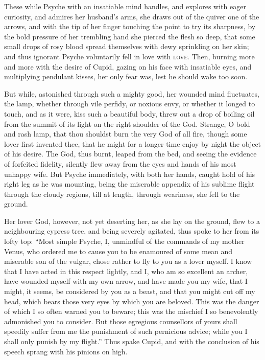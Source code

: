 \documentclass{article}
\begin{document}
These while Psyche with an insatiable mind handles, and explores with eager
curiosity, and admires her husband's arms, she draws out of the quiver one of
the arrows, and with the tip of her finger touching the point to try its
sharpness, by the bold pressure of her trembling hand she pierced the flesh so
deep, that some small drops of rosy blood spread themselves with dewy
sprinkling on her skin; and thus ignorant Psyche voluntarily fell in love with
\textsc{love}. Then, burning more and more with the desire of Cupid, gazing on
his face with insatiable eyes, and multiplying pendulant kisses, her only fear
was, lest he should wake too soon.

But while, astonished through such a mighty good, her wounded mind fluctuates,
the lamp, whether through vile perfidy, or noxious envy, or whether it longed
to touch, and as it were, kiss such a beautiful body, threw out a drop of
boiling oil from the summit of its light on the right shoulder of the God.
Strange, O bold and rash lamp, that thou shouldst burn the very God of all
fire, though some lover first invented thee, that he might for a longer time
enjoy by night the object of his desire. The God, thus burnt, leaped from the
bed, and seeing the evidence of forfeited fidelity, silently flew away from
the eyes and hands of his most unhappy wife. But Psyche immediately, with both
her hands, caught hold of his right leg as he was mounting, being the miserable
appendix of his sublime flight through the cloudy regions, till at length,
through weariness, she fell to the ground.

Her lover God, however, not yet deserting her, as she lay on the ground, flew
to a neighbouring cypress tree, and being severely agitated, thus spoke to her
from its lofty top: ``Most simple Psyche, I, unmindful of the commands of my
mother Venus, who ordered me to cause you to be enamoured of some mean and
miserable son of the vulgar, chose rather to fly to you as a lover myself. I
know that I have acted in this respect lightly, and I, who am so excellent an
archer, have wounded myself with my own arrow, and have made you my wife, that
I might, it seems, be considered by you as a beast, and that you might cut off
my head, which bears those very eyes by which you are beloved. This was the
danger of which I so often warned you to beware; this was the mischief I so
benevolently admonished you to consider. But those egregious counsellors of
yours shall speedily suffer from me the punishment of such pernicious advice;
while you I shall only punish by my flight.'' Thus spake Cupid, and with the
conclusion of his speech sprang with his pinions on high.
\end{document}
